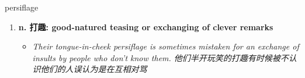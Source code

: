 
\begin{frame}
{\huge persiflage}
\begin{center}
\begin{enumerate}\Large
  \item \textbf{n. 打趣: good-natured teasing or exchanging of clever remarks}
  \begin{itemize}
    \item \em{\Large{Their tongue-in-cheek persiflage is sometimes mistaken for an exchange of insults by people who don't know them. 他们半开玩笑的打趣有时候被不认识他们的人误认为是在互相对骂}}
  \end{itemize}
\end{enumerate}
\end{center}
\end{frame}
